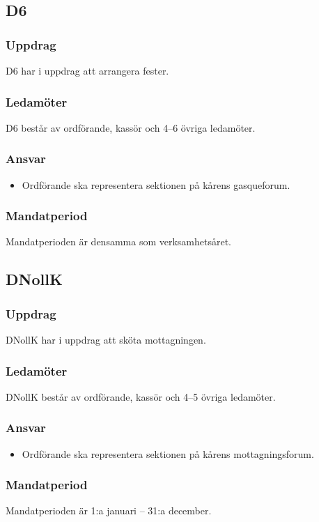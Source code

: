 \subsection{D6}
\subsubsection{Uppdrag}
D6 har i uppdrag att arrangera fester. 
\subsubsection{Ledamöter}
D6 består av ordförande, kassör och 4--6 övriga ledamöter.
\subsubsection{Ansvar}
\begin{itemize}
    \item Ordförande ska representera sektionen på kårens gasqueforum.
\end{itemize}
\subsubsection{Mandatperiod}
Mandatperioden är densamma som verksamhetsåret. 

\subsection{DNollK}
\subsubsection{Uppdrag}
DNollK har i uppdrag att sköta mottagningen. 
\subsubsection{Ledamöter}
DNollK består av ordförande, kassör och 4--5 övriga ledamöter.
\subsubsection{Ansvar}
\begin{itemize}
    \item Ordförande ska representera sektionen på kårens mottagningsforum.
\end{itemize}
\subsubsection{Mandatperiod}
Mandatperioden är 1:a januari – 31:a december.


